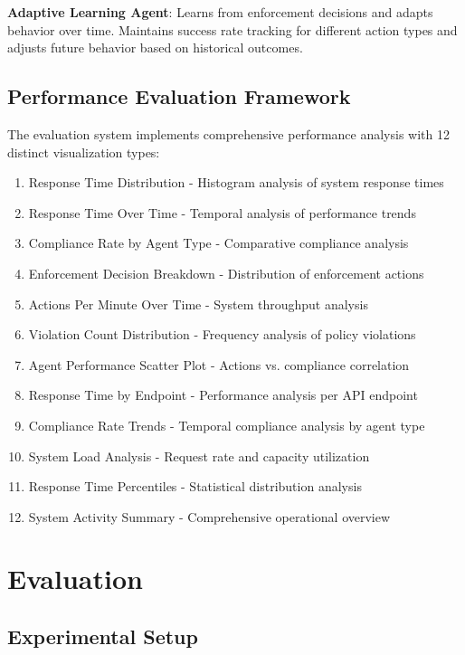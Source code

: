 \documentclass[letterpaper]{article}
\begin{document}
\textbf{Adaptive Learning Agent}: Learns from enforcement decisions and adapts behavior over time. Maintains success rate tracking for different action types and adjusts future behavior based on historical outcomes.

\subsection{Performance Evaluation Framework}

The evaluation system implements comprehensive performance analysis with 12 distinct visualization types:

\begin{enumerate}
\item Response Time Distribution - Histogram analysis of system response times
\item Response Time Over Time - Temporal analysis of performance trends
\item Compliance Rate by Agent Type - Comparative compliance analysis
\item Enforcement Decision Breakdown - Distribution of enforcement actions
\item Actions Per Minute Over Time - System throughput analysis
\item Violation Count Distribution - Frequency analysis of policy violations
\item Agent Performance Scatter Plot - Actions vs. compliance correlation
\item Response Time by Endpoint - Performance analysis per API endpoint
\item Compliance Rate Trends - Temporal compliance analysis by agent type
\item System Load Analysis - Request rate and capacity utilization
\item Response Time Percentiles - Statistical distribution analysis
\item System Activity Summary - Comprehensive operational overview
\end{enumerate}

\section{Evaluation}

\subsection{Experimental Setup}
\end{document}
